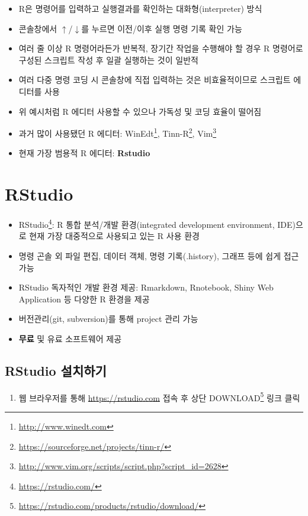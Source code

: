 \documentclass[
  11pt,
]{krantz}
\providecommand{\tightlist}{%
  \setlength{\itemsep}{0pt}\setlength{\parskip}{0pt}}
\renewcommand{\href}[2]{#2\footnote{\url{#1}}}
\begin{document}
\begin{itemize}
\tightlist
\item
  R은 명령어를 입력하고 실행결과를 확인하는 대화형(interpreter) 방식
\item
  콘솔창에서 \(\uparrow\)/\(\downarrow\)를 누르면 이전/이후 실행 명령 기록 확인 가능
\item
  여러 줄 이상 R 명령어라든가 반복적, 장기간 작업을 수행해야 할 경우 R 명령어로 구성된 스크립트 작성 후 일괄 실행하는 것이 일반적
\item
  여러 다중 명령 코딩 시 콘솔창에 직접 입력하는 것은 비효율적이므로 스크립트 에디터를 사용
\item
  위 예시처럼 R 에디터 사용할 수 있으나 가독성 및 코딩 효율이 떨어짐
\item
  과거 많이 사용됐던 R 에디터: \href{http://www.winedt.com}{WinEdt}, \href{https://sourceforge.net/projects/tinn-r/}{Tinn-R}, \href{http://www.vim.org/scripts/script.php?script_id=2628}{Vim}
\item
  현재 가장 범용적 R 에디터: \textbf{Rstudio}
\end{itemize}

\hypertarget{r-studio}{%
\section{RStudio}\label{r-studio}}

\begin{itemize}
\tightlist
\item
  \href{https://rstudio.com/}{RStudio}: R 통합 분석/개발 환경(integrated development environment, IDE)으로 현재 가장 대중적으로 사용되고 있는 R 사용 환경
\item
  명령 곤솔 외 파일 편집, 데이터 객체, 명령 기록(.history), 그래프 등에 쉽게 접근 가능
\item
  RStudio 독자적인 개발 환경 제공: Rmarkdown, Rnotebook, Shiny Web Application 등 다양한 R 환경을 제공
\item
  버전관리(git, subversion)를 통해 project 관리 가능
\item
  \textbf{무료} 및 유료 소프트웨어 제공
\end{itemize}

\hypertarget{rstudio-install}{%
\subsection{RStudio 설치하기}\label{rstudio-install}}

\begin{enumerate}
\def\labelenumi{\arabic{enumi}.}
\tightlist
\item
  웹 브라우저를 통해 \url{https://rstudio.com} 접속 후 상단 \href{https://rstudio.com/products/rstudio/download/}{DOWNLOAD} 링크 클릭
\end{enumerate}
\end{document}
